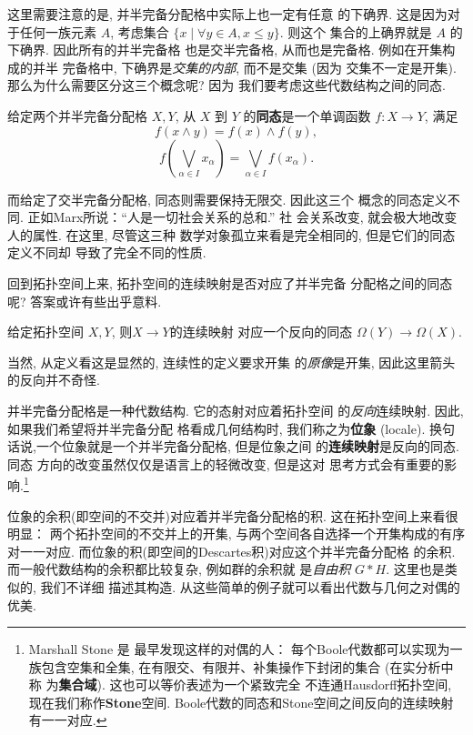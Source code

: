 这里需要注意的是, 并半完备分配格中实际上也一定有任意
的下确界. 这是因为对于任何一族元素 \(A\), 考虑集合
\(\{x \mid \forall y \in A, x \le y\}\). 则这个
集合的上确界就是 \(A\) 的下确界. 因此所有的并半完备格
也是交半完备格, 从而也是完备格. 例如在开集构成的并半
完备格中, 下确界是\emph{交集的内部}, 而不是交集 (因为
交集不一定是开集). 那么为什么需要区分这三个概念呢? 因为
我们要考虑这些代数结构之间的同态.

\begin{definition}
给定两个并半完备分配格 \(X, Y\), 从 \(X\) 到 \(Y\)
的\textbf{同态}是一个单调函数 \(f : X \to Y\), 满足
\[f(x\wedge y) = f(x) \wedge f(y),\]
\[f\left(\bigvee_{\alpha \in I} x_\alpha\right)
= \bigvee_{\alpha \in I} f(x_\alpha).\]
\end{definition}

而给定了交半完备分配格, 同态则需要保持无限交. 因此这三个
概念的同态定义不同. 正如Marx所说：“人是一切社会关系的总和.” 社
会关系改变, 就会极大地改变人的属性. 在这里, 尽管这三种
数学对象孤立来看是完全相同的, 但是它们的同态定义不同却
导致了完全不同的性质.

回到拓扑空间上来, 拓扑空间的连续映射是否对应了并半完备
分配格之间的同态呢? 答案或许有些出乎意料.
\begin{theorem}
给定拓扑空间 \(X, Y\), 则\(X \to Y\)的连续映射
对应一个反向的同态 \(\Omega(Y) \to \Omega(X)\).
\end{theorem}
当然, 从定义看这是显然的, 连续性的定义要求开集
的\emph{原像}是开集, 因此这里箭头的反向并不奇怪.

并半完备分配格是一种代数结构. 它的态射对应着拓扑空间
的\emph{反向}连续映射. 因此, 如果我们希望将并半完备分配
格看成几何结构时, 我们称之为\textbf{位象} (locale).
换句话说,一个位象就是一个并半完备分配格, 但是位象之间
的\textbf{连续映射}是反向的同态. 同态
方向的改变虽然仅仅是语言上的轻微改变, 但是这对
思考方式会有重要的影响.\footnote{Marshall Stone 是
最早发现这样的对偶的人： 每个Boole代数都可以实现为一族包含空集和全集,
在有限交、有限并、补集操作下封闭的集合 (在实分析中称
为\textbf{集合域}). 这也可以等价表述为一个紧致完全
不连通Hausdorff拓扑空间, 现在我们称作\textbf{Stone}空间.
Boole代数的同态和Stone空间之间反向的连续映射有一一对应.}

位象的余积(即空间的不交并)对应着并半完备分配格的积.
这在拓扑空间上来看很明显： 两个拓扑空间的不交并上的开集,
与两个空间各自选择一个开集构成的有序对一一对应.
而位象的积(即空间的Descartes积)对应这个并半完备分配格
的余积. 而一般代数结构的余积都比较复杂, 例如群的余积就
是\emph{自由积} \(G * H\). 这里也是类似的, 我们不详细
描述其构造. 从这些简单的例子就可以看出代数与几何之对偶的
优美.

